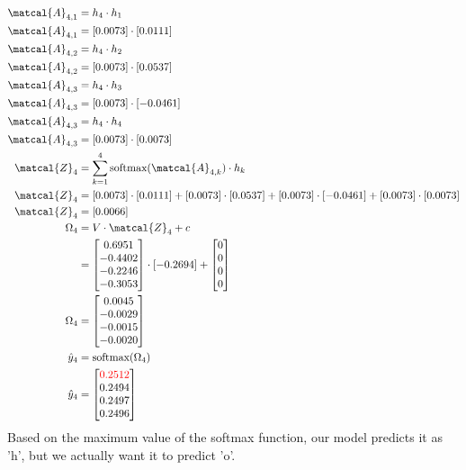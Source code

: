 \documentclass{article}
\begin{document}
\begin{align*}
\matcal{A}_{4,1} &= h_4 \cdot h_1 \\
\matcal{A}_{4,1} &= [0.0073] \cdot [0.0111] \\
\matcal{A}_{4,2} &= h_4 \cdot h_2 \\
\matcal{A}_{4,2} &= [0.0073] \cdot [0.0537] \\
\matcal{A}_{4,3} &= h_4 \cdot h_3 \\
\matcal{A}_{4,3} &= [0.0073] \cdot [-0.0461] \\
\matcal{A}_{4,3} &= h_4 \cdot h_4 \\
\matcal{A}_{4,3} &= [0.0073] \cdot [0.0073] \\
\matcal{Z}_4 &= \sum_{k=1}^4 \text{softmax}(\matcal{A}_{4,k}) \cdot h_k \\
\matcal{Z}_4 &= [0.0073] \cdot [0.0111] + [0.0073] \cdot [0.0537]+ [0.0073] \cdot [-0.0461]+ [0.0073] \cdot [0.0073]\\
\matcal{Z}_4 &= [0.0066] \\
\Omega_4 &= V \cdot \matcal{Z}_4 + c \\
 &= \begin{bmatrix}
  0.6951 \\
 -0.4402 \\
 -0.2246 \\
 -0.3053
\end{bmatrix} \cdot [-0.2694] + \begin{bmatrix} 0 \\ 0 \\ 0 \\ 0\end{bmatrix}\\
\Omega_4 &= \begin{bmatrix}
 0.0045 \\
-0.0029 \\
-0.0015 \\
-0.0020
\end{bmatrix} \\
\hat{y}_4 &= \text{softmax}(\Omega_4) \\
\hat{y}_4 &= \begin{bmatrix}
\textcolor{red}{0.2512} \\
0.2494 \\
0.2497 \\
0.2496
\end{bmatrix} \\
\end{align*}
Based on the maximum value of the softmax function, our model predicts it as 'h', but we actually want it to predict 'o'.
\end{document}
